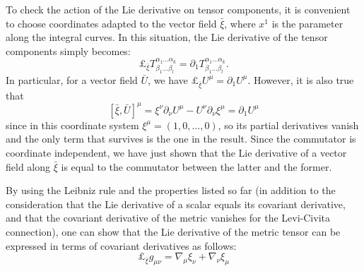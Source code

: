 \documentclass[a4paper]{article}
\begin{document}
To check the action of the Lie derivative on tensor components, it is convenient to choose coordinates adapted to the vector field $\bar{\xi}$, where $x^1$ is the parameter along the integral curves. In this situation, the Lie derivative of the tensor components simply becomes:
$$\pounds_{\bar{\xi}}T^{\alpha_1\ldots \alpha_k}_{\beta_1\ldots\beta_l} = \partial_1 T^{\alpha_1\ldots \alpha_k}_{\beta_1\ldots\beta_l}.$$
In particular, for a vector field $\bar{U}$, we have $\pounds_{\bar{\xi}}U^{\mu} = \partial_1 U^{\mu}$.
However, it is also true that
$$\left[\bar{\xi},\bar{U}\right]^{\mu} = \xi^{\nu}\partial_{\nu}U^{\mu} - U^{\nu}\partial_{\nu}\xi^{\mu} = \partial_1 U^{\mu}$$
since in this coordinate system $\xi^{\mu} = (1,0,\ldots,0)$, so its partial derivatives vanish and the only term that survives is the one in the result. Since the commutator is coordinate independent, we have just shown that the Lie derivative of a vector field along $\bar{\xi}$ is equal to the commutator between the latter and the former.

By using the Leibniz rule and the properties listed so far (in addition to the consideration that the Lie derivative of a scalar equals its covariant derivative, and that the covariant derivative of the metric vanishes for the Levi-Civita connection), one can show that the Lie derivative of the metric tensor can be expressed in terms of covariant derivatives as follows:
\begin{equation}
  \pounds_{\bar{\xi}}g_{\mu\nu} = \nabla_{\mu}\xi_{\nu} + \nabla_{\nu}\xi_{\mu}
  \label{eq:lie-metric}
\end{equation}
\end{document}
